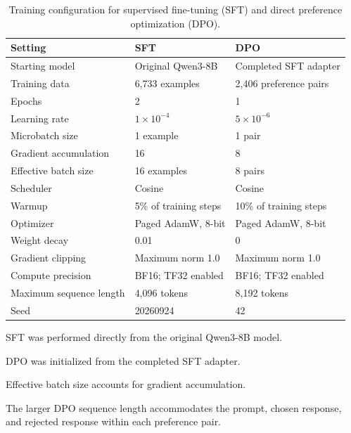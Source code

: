 \documentclass[10pt]{reportMaster}
\begin{document}
\begin{table}[t]
\centering
\caption{Training configuration for supervised fine-tuning (SFT) and direct preference optimization (DPO).}
\label{tab:training-config}
\begin{threeparttable}
\begin{tabular}{
    l
    l
    l
}
\toprule
\textbf{Setting}
& \textbf{SFT}
& \textbf{DPO} \\
\midrule

Starting model
& Original Qwen3-8B
& Completed SFT adapter \\

Training data
& 6,733 examples
& 2,406 preference pairs \\

Epochs
& 2
& 1 \\

Learning rate
& $1 \times 10^{-4}$
& $5 \times 10^{-6}$ \\

Microbatch size
& 1 example
& 1 pair \\

Gradient accumulation
& 16
& 8 \\

Effective batch size
& 16 examples
& 8 pairs \\

Scheduler
& Cosine
& Cosine \\

Warmup
& 5\% of training steps
& 10\% of training steps \\

Optimizer
& Paged AdamW, 8-bit
& Paged AdamW, 8-bit \\

Weight decay
& 0.01
& 0 \\

Gradient clipping
& Maximum norm 1.0
& Maximum norm 1.0 \\

Compute precision
& BF16; TF32 enabled
& BF16; TF32 enabled \\

Maximum sequence length
& 4,096 tokens
& 8,192 tokens \\

Seed
& 20260924
& 42 \\

\bottomrule
\end{tabular}

\begin{tablenotes}[flushleft]
\footnotesize
\item SFT was performed directly from the original Qwen3-8B model.
\item DPO was initialized from the completed SFT adapter.
\item Effective batch size accounts for gradient accumulation.
\item The larger DPO sequence length accommodates the prompt, chosen response,
and rejected response within each preference pair.
\end{tablenotes}
\end{threeparttable}
\end{table}
\end{document}
